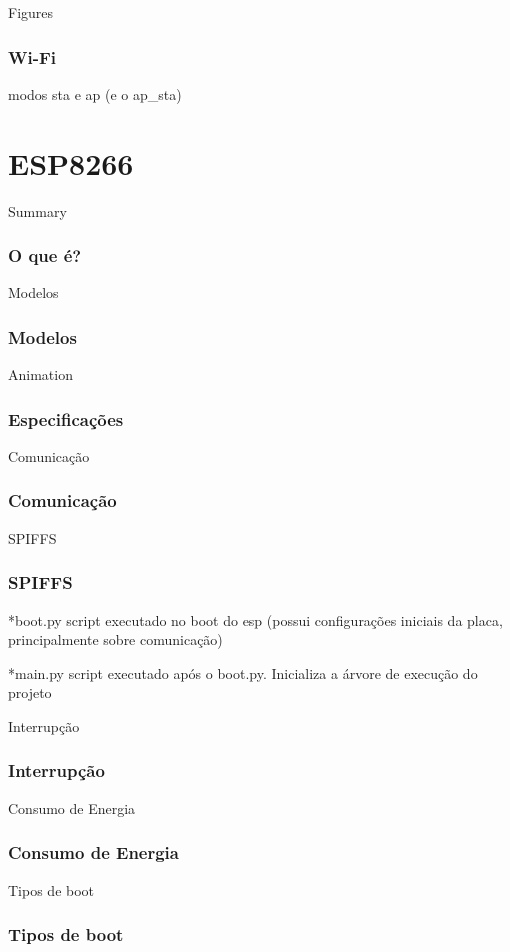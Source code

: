 \documentclass[10pt, compress]{beamer}
\begin{document}
\begin{frame}{Figures}
  \frametitle{Wi-Fi}
  modos sta e ap (e o ap\_sta)
\end{frame}

\section{ESP8266}

\begin{frame}{Summary}
  \frametitle{O que é?}
\end{frame}

\begin{frame}{Modelos}
  \frametitle{Modelos}
\end{frame}

\begin{frame}{Animation}
  \frametitle{Especificações}
\end{frame}

\begin{frame}{Comunicação}
  \frametitle{Comunicação}
\end{frame}

\begin{frame}{SPIFFS}
  \frametitle{SPIFFS}

  *boot.py script executado no boot do esp (possui configurações iniciais da placa, principalmente sobre comunicação)

  *main.py script executado após o boot.py. Inicializa a árvore de execução do projeto


\end{frame}

\begin{frame}{Interrupção}
  \frametitle{Interrupção}
\end{frame}

\begin{frame}{Consumo de Energia}
  \frametitle{Consumo de Energia}
\end{frame}

\begin{frame}{Tipos de boot}
  \frametitle{Tipos de boot}
\end{frame}
\end{document}
